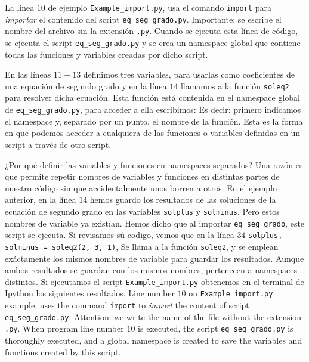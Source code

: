 \begin{paracol}{2}
La línea $10$ de ejemplo \texttt{Example_import.py}, usa el comando \texttt{import} para \emph{importar} el contenido del script \texttt{eq_seg_grado.py}. Importante: se escribe el nombre del archivo sin la extensión \texttt{.py}. Cuando se ejecuta esta línea de código, se ejecuta el script \texttt{eq_seg_grado.py} y se crea un namespace global que contiene todas las funciones y variables creadas por dicho script.

En las líneas $11-13$ definimos tres variables, para usarlas como coeficientes de una equación de segundo grado y en la línea $14$ llamamos a la función \texttt{soleq2} para resolver dicha ecuación. Esta función está contenida en el namespace global de \texttt{eq_seg_grado.py}, para acceder a ella escribimos:
Es decir: primero indicamos el namespace y, separado por un punto, el nombre de la función. Esta es la forma en que podemos acceder a cualquiera de las funciones o variables definidas en un script a través de otro script.

¿Por qué definir las variables y funciones en namespaces separados? Una razón es que permite repetir nombres de variables y funciones en distintas partes de nuestro código sin que accidentalmente unos borren a otros. En el ejemplo anterior, en la línea $14$ hemos guardo los resultados de las soluciones de la ecuación de segundo grado en las variables \texttt{solplus} y \texttt{solminus}. Pero estos nombres de variable ya existían. Hemos dicho que al importar \texttt{eq_seg_grado}, este script se ejecuta. Si revisamos sú codigo, vemos que en la línea $34$ \texttt{solplus, solminus = soleq2(2, 3, 1)}, Se llama a la función \texttt{soleq2}, y se emplean exáctamente los mismos nombres de variable para guardar los resultados. Aunque ambos resultados se guardan con los mismos nombres, pertenecen a namespaces distintos. Si ejecutamos el script \texttt{Example_import.py} obtenemos en el terminal de Ipython los siguientes resultados,
\switchcolumn
Line number $10$ on \texttt{Example_import.py} example, uses the command \texttt{import} to \emph{import} the content of script \texttt{eq_seg_grado.py}. Attention: we write the name of the file without the extension \texttt{.py}. When program line number $10$ is executed, the script \texttt{eq_seg_grado.py} is thoroughly executed, and a global namespace is created to save the variables and functions created by this script.


\end{paracol}
